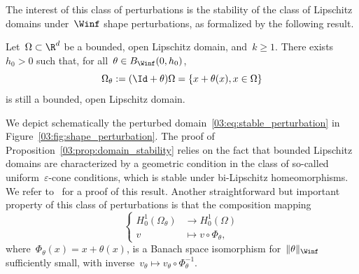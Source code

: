         The interest of this class of perturbations is the stability of the class of Lipschitz domains under~$\Winf$ shape perturbations, as formalized by the following result.
        \begin{proposition}
            \label{03:prop:domain_stability}
            Let~$\Omega\subset \R^d$ be a bounded, open Lipschitz domain, and~$k\geq 1$. There exists~$h_0>0$ such that, for all~$\theta\in B_{\Winf}(0,h_0)$,
            \begin{equation}
                \label{03:eq:stable_perturbation}
                \Omega_\theta := (\Id+\theta)\Omega = \left\{x+\theta(x),x\in\Omega\right\}
            \end{equation}
            is still a bounded, open Lipschitz domain.
        \end{proposition}
        We depict schematically the perturbed domain~\eqref{03:eq:stable_perturbation} in Figure~\ref{03:fig:shape_perturbation}.
        The proof of Proposition~\ref{03:prop:domain_stability} relies on the fact that bounded Lipschitz domains are characterized by a geometric condition in the class of so-called uniform~$\varepsilon$-cone conditions, which is stable under bi-Lipschitz homeomorphisms. We refer to~\cite[Section III]{C75} for a proof of this result.
        Another straightforward but important property of this class of perturbations is that the composition mapping
        \begin{equation}
            \label{03:eq:composition}
            \left\{\begin{aligned}
                H_0^1(\Omega_\theta)&\to H_0^1(\Omega)\\
                v&\mapsto v\circ \Phi_\theta,
            \end{aligned}\right.
        \end{equation}
        where~$\Phi_\theta(x) = x + \theta(x)$, is a Banach space isomorphism for~$\|\theta\|_{\Winf}$ sufficiently small, with inverse~$v_\theta\mapsto v_\theta\circ \Phi_\theta^{-1}$.
